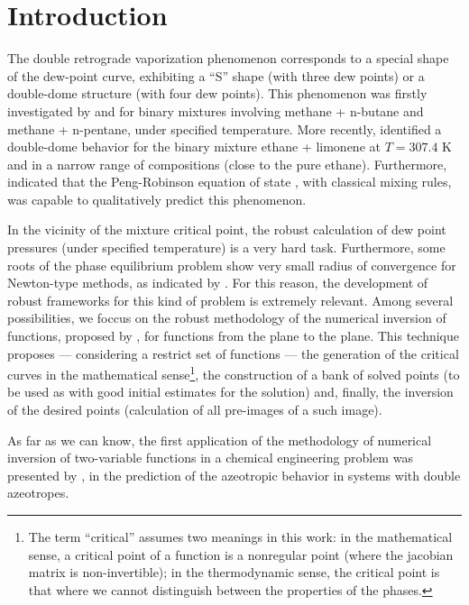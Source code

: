 \documentclass[journal=iecred,manuscript=article]{achemso}
\theoremstyle{definition}
\theoremstyle{remark}
\begin{document}
\section{Introduction}
The double retrograde vaporization phenomenon corresponds to a special shape of the dew-point curve, exhibiting a ``S'' shape (with three dew points) or a double-dome structure (with four dew points). This phenomenon was firstly investigated by \citet{chen_1} and \citet{chen_2} for binary mixtures involving methane + n-butane and methane + n-pentane, under specified temperature. More recently, \citet{raeissi_1} identified a double-dome behavior for the binary mixture ethane + limonene at $T = 307.4$ K and in a narrow range of compositions (close to the pure ethane). Furthermore, \citet{raeissi_2} indicated that the Peng-Robinson equation of state \citep{peng_robinson}, with classical mixing rules, was capable to qualitatively predict this phenomenon.

In the vicinity of the mixture critical point, the robust calculation of dew point pressures (under specified temperature) is a very hard task. Furthermore, some roots of the phase equilibrium problem show very small radius of convergence for Newton-type methods, as indicated by \citet{jnsa}. For this reason, the development of robust frameworks for this kind of problem is extremely relevant. Among several possibilities, we foccus on the robust methodology of the numerical inversion of functions, proposed by \citet{malta}, for functions from
the plane to the plane. This technique \citep{malta} proposes --- considering a restrict set of functions --- the generation of the critical curves in the mathematical 
sense\footnote{The term ``critical''  assumes two meanings in this work: in the mathematical sense, a critical point of a function
 is a nonregular point (where the jacobian matrix is non-invertible); in the thermodynamic sense, the critical point is that where we cannot distinguish between the properties of the phases.}, the construction of a bank of solved points (to be used as 
 with good initial estimates for the solution) and, finally, the inversion of the desired points (calculation of all pre-images of a such image).

As far as we can know, the first application of the methodology  of numerical inversion of two-variable functions in a chemical engineering problem was presented by \citet{canadian}, in the prediction of the azeotropic behavior in systems with double azeotropes.
\end{document}
